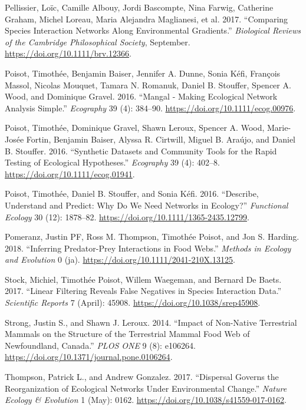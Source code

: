 \leavevmode\hypertarget{ref-PellAlbo17}{}%
Pellissier, Loïc, Camille Albouy, Jordi Bascompte, Nina Farwig,
Catherine Graham, Michel Loreau, Maria Alejandra Maglianesi, et al.
2017. ``Comparing Species Interaction Networks Along Environmental
Gradients.'' \emph{Biological Reviews of the Cambridge Philosophical
Society}, September. \url{https://doi.org/10.1111/brv.12366}.

\leavevmode\hypertarget{ref-PoisBais16}{}%
Poisot, Timothée, Benjamin Baiser, Jennifer A. Dunne, Sonia Kéfi,
François Massol, Nicolas Mouquet, Tamara N. Romanuk, Daniel B. Stouffer,
Spencer A. Wood, and Dominique Gravel. 2016. ``Mangal - Making
Ecological Network Analysis Simple.'' \emph{Ecography} 39 (4): 384--90.
\url{https://doi.org/10.1111/ecog.00976}.

\leavevmode\hypertarget{ref-PoisGrav16}{}%
Poisot, Timothée, Dominique Gravel, Shawn Leroux, Spencer A. Wood,
Marie-Josée Fortin, Benjamin Baiser, Alyssa R. Cirtwill, Miguel B.
Araújo, and Daniel B. Stouffer. 2016. ``Synthetic Datasets and Community
Tools for the Rapid Testing of Ecological Hypotheses.'' \emph{Ecography}
39 (4): 402--8. \url{https://doi.org/10.1111/ecog.01941}.

\leavevmode\hypertarget{ref-PoisStou16}{}%
Poisot, Timothée, Daniel B. Stouffer, and Sonia Kéfi. 2016. ``Describe,
Understand and Predict: Why Do We Need Networks in Ecology?''
\emph{Functional Ecology} 30 (12): 1878--82.
\url{https://doi.org/10.1111/1365-2435.12799}.

\leavevmode\hypertarget{ref-PomeThom18}{}%
Pomeranz, Justin PF, Ross M. Thompson, Timothée Poisot, and Jon S.
Harding. 2018. ``Inferring Predator-Prey Interactions in Food Webs.''
\emph{Methods in Ecology and Evolution} 0 (ja).
\url{https://doi.org/10.1111/2041-210X.13125}.

\leavevmode\hypertarget{ref-StocPois17}{}%
Stock, Michiel, Timothée Poisot, Willem Waegeman, and Bernard De Baets.
2017. ``Linear Filtering Reveals False Negatives in Species Interaction
Data.'' \emph{Scientific Reports} 7 (April): 45908.
\url{https://doi.org/10.1038/srep45908}.

\leavevmode\hypertarget{ref-StroLero14}{}%
Strong, Justin S., and Shawn J. Leroux. 2014. ``Impact of Non-Native
Terrestrial Mammals on the Structure of the Terrestrial Mammal Food Web
of Newfoundland, Canada.'' \emph{PLOS ONE} 9 (8): e106264.
\url{https://doi.org/10.1371/journal.pone.0106264}.

\leavevmode\hypertarget{ref-ThomGonz17}{}%
Thompson, Patrick L., and Andrew Gonzalez. 2017. ``Dispersal Governs the
Reorganization of Ecological Networks Under Environmental Change.''
\emph{Nature Ecology \& Evolution} 1 (May): 0162.
\url{https://doi.org/10.1038/s41559-017-0162}.

